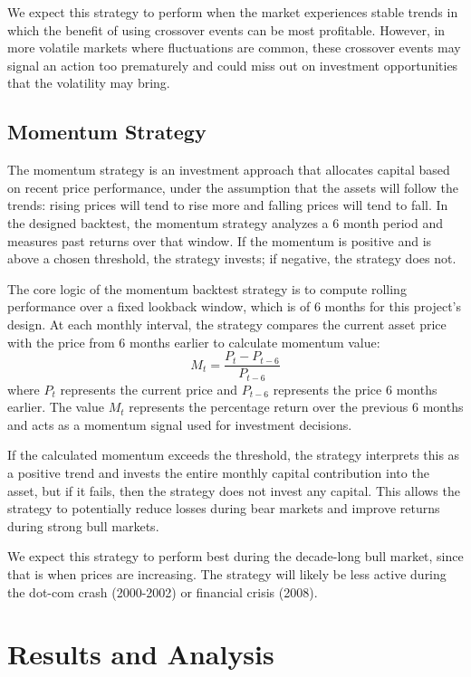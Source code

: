 \documentclass[12pt]{article}
\begin{document}
We expect this strategy to perform when the market experiences stable trends in which the benefit of using crossover events can be most profitable. However, in more volatile markets where fluctuations are common, these crossover events may signal an action too prematurely and could miss out on investment opportunities that the volatility may bring. 

\subsection{Momentum Strategy}

The momentum strategy is an investment approach that allocates capital based on recent price performance, 
under the assumption that the assets will follow the trends: rising prices will tend to rise more and falling 
prices will tend to fall. 
In the designed backtest, the momentum strategy analyzes a 6 month period and measures past returns over that 
window. If the momentum is positive and is above a chosen threshold, the strategy invests; if negative, 
the strategy does not. 

The core logic of the momentum backtest strategy is to compute rolling performance over a fixed lookback window, 
which is of 6 months for this project's design. 
At each monthly interval, the strategy compares the current asset price with the price from 6 months earlier 
to calculate momentum value: 
\[M_t = \dfrac{P_t - P_{t-6}}{P_{t-6}} \]
where $P_t$ represents the current price and $P_{t-6}$ represents the price 6 months earlier. The value $M_t$ represents the percentage return over the previous 6 months and acts as a momentum signal used for investment decisions. 

If the calculated momentum exceeds the threshold, the strategy interprets this as a positive trend and invests 
the entire monthly capital contribution into the asset, but if it fails, then the strategy does not invest any capital. 
This allows the strategy to potentially reduce losses during bear markets and improve returns during strong bull markets. 

We expect this strategy to perform best during the decade-long bull market, since that is when prices are 
increasing. 
The strategy will likely be less active during the dot-com crash (2000-2002) or financial crisis (2008). 


\section{Results and Analysis}
\end{document}
